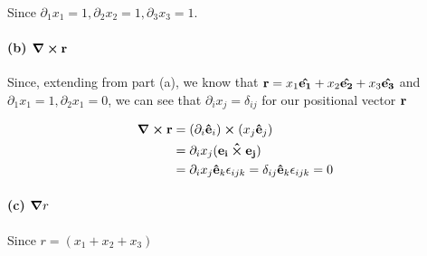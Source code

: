 \documentclass{article}
\numberwithin{equation}{section}
\newcommand{\vbh}[1]{\vb{\hat{#1}}}
\begin{document}
Since $\partial_1 x_1 = 1, \partial_2 x_2 = 1, \partial_3 x_3 = 1$.

\paragraph{(b) $\curl \vb{r}$}

Since, extending from part (a), we know that $\vb{r} = x_1 \vbh{e_1} + x_2 \vbh{e_2}+x_3 \vbh{e_3}$ and $\partial_1 x_1 = 1, \partial_2 x_1 = 0$, we can see that $\partial_i x_j = \delta_{ij}$ for our positional vector $\vb{r}$

\begin{equation}
    \begin{split}
        \curl \vb{r} &= (\partial_i \vbh{e}_i) \cross (x_j \vbh{e}_j) \\
        &= \partial_i x_j (\vbh{e_i \cross e_j}) \\
        &= \partial_i x_j \vbh{e}_k \epsilon_{ijk} = \delta_{ij} \vbh{e}_k \epsilon_{ijk} = 0
    \end{split}
\end{equation}

\paragraph{(c) $\grad r$}

Since $r = (x_1 + x_2 + x_3)$
\end{document}
